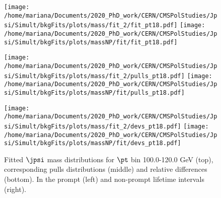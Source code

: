 \pagebreak

\begin{figure}[h!]
\centering
\texttt{[image: /home/mariana/Documents/2020\_PhD\_work/CERN/CMSPolStudies/Jpsi/Simult/bkgFits/plots/mass/fit\_2/fit\_pt18.pdf]}
\texttt{[image: /home/mariana/Documents/2020\_PhD\_work/CERN/CMSPolStudies/Jpsi/Simult/bkgFits/plots/massNP/fit/fit\_pt18.pdf]}

\texttt{[image: /home/mariana/Documents/2020\_PhD\_work/CERN/CMSPolStudies/Jpsi/Simult/bkgFits/plots/mass/fit\_2/pulls\_pt18.pdf]}
\texttt{[image: /home/mariana/Documents/2020\_PhD\_work/CERN/CMSPolStudies/Jpsi/Simult/bkgFits/plots/massNP/fit/pulls\_pt18.pdf]}

\texttt{[image: /home/mariana/Documents/2020\_PhD\_work/CERN/CMSPolStudies/Jpsi/Simult/bkgFits/plots/mass/fit\_2/devs\_pt18.pdf]}
\texttt{[image: /home/mariana/Documents/2020\_PhD\_work/CERN/CMSPolStudies/Jpsi/Simult/bkgFits/plots/massNP/fit/devs\_pt18.pdf]}
\caption{Fitted $\jpsi$ mass distributions for $\pt$ bin 100.0-120.0 GeV (top), corresponding pulls distributions (middle) and relative differences (bottom). In the prompt (left) and non-prompt lifetime intervals (right).}\label{f:m_fit_18}
\end{figure}

\pagebreak

